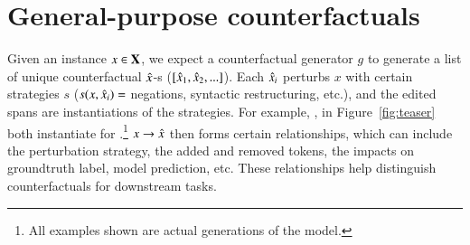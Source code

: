 \section{General-purpose counterfactuals}

% 
Given an instance $x \in \mathbf{X}$, we expect a counterfactual generator $g$ to generate a list of unique counterfactual $\hat{x}$-s ($[\hat{x}_1, \hat{x}_2, ...]$).
Each $\hat{x}_i$ perturbs $x$ with certain strategies $s$ ($s(x, \hat{x}_i)=$ negations, syntactic restructuring, etc.), and the edited spans are instantiations of the strategies.
For example, ,  in Figure~\ref{fig:teaser} both instantiate for .\footnote{All examples shown are actual generations of the model.}
$x\rightarrow \hat{x}$ then forms certain relationships, which can include the perturbation strategy, the added and removed tokens, the impacts on groundtruth label, model prediction, etc.
These relationships help distinguish counterfactuals for downstream tasks.

